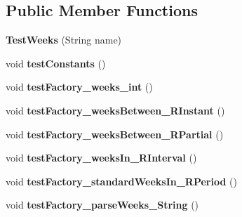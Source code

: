 \subsection*{Public Member Functions}
\begin{DoxyCompactItemize}
\item 
\hypertarget{classorg_1_1joda_1_1time_1_1_test_weeks_a71c172f8e20af1c96981ed042c12046d}{{\bfseries Test\-Weeks} (String name)}\label{classorg_1_1joda_1_1time_1_1_test_weeks_a71c172f8e20af1c96981ed042c12046d}

\item 
\hypertarget{classorg_1_1joda_1_1time_1_1_test_weeks_a1e1ad4c9da6410363663bc8b73c78187}{void {\bfseries test\-Constants} ()}\label{classorg_1_1joda_1_1time_1_1_test_weeks_a1e1ad4c9da6410363663bc8b73c78187}

\item 
\hypertarget{classorg_1_1joda_1_1time_1_1_test_weeks_a1c1bd704237814c8b7f9abbf23b1a6c5}{void {\bfseries test\-Factory\-\_\-weeks\-\_\-int} ()}\label{classorg_1_1joda_1_1time_1_1_test_weeks_a1c1bd704237814c8b7f9abbf23b1a6c5}

\item 
\hypertarget{classorg_1_1joda_1_1time_1_1_test_weeks_ae95cf343a1138525ad02600f62ff5c79}{void {\bfseries test\-Factory\-\_\-weeks\-Between\-\_\-\-R\-Instant} ()}\label{classorg_1_1joda_1_1time_1_1_test_weeks_ae95cf343a1138525ad02600f62ff5c79}

\item 
\hypertarget{classorg_1_1joda_1_1time_1_1_test_weeks_a0bc812582f45839732bcb94d23e1711c}{void {\bfseries test\-Factory\-\_\-weeks\-Between\-\_\-\-R\-Partial} ()}\label{classorg_1_1joda_1_1time_1_1_test_weeks_a0bc812582f45839732bcb94d23e1711c}

\item 
\hypertarget{classorg_1_1joda_1_1time_1_1_test_weeks_a2d803b733c7a27bc7445fe860703e6ec}{void {\bfseries test\-Factory\-\_\-weeks\-In\-\_\-\-R\-Interval} ()}\label{classorg_1_1joda_1_1time_1_1_test_weeks_a2d803b733c7a27bc7445fe860703e6ec}

\item 
\hypertarget{classorg_1_1joda_1_1time_1_1_test_weeks_a29b5dd2fb17ff585215f545abee36b21}{void {\bfseries test\-Factory\-\_\-standard\-Weeks\-In\-\_\-\-R\-Period} ()}\label{classorg_1_1joda_1_1time_1_1_test_weeks_a29b5dd2fb17ff585215f545abee36b21}

\item 
\hypertarget{classorg_1_1joda_1_1time_1_1_test_weeks_ad2652890d096a75b032f37e5b2e885ea}{void {\bfseries test\-Factory\-\_\-parse\-Weeks\-\_\-\-String} ()}\label{classorg_1_1joda_1_1time_1_1_test_weeks_ad2652890d096a75b032f37e5b2e885ea}


\end{DoxyCompactItemize}
